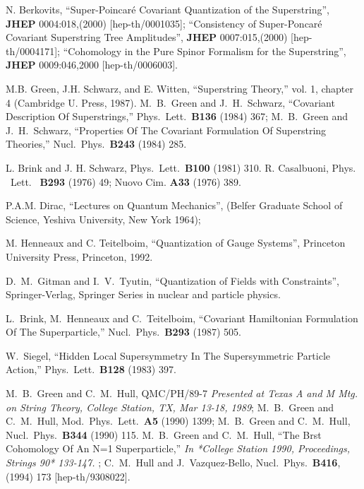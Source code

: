 \documentclass[a4paper,12pt]{article}
\begin{document}


\bigskip
\begin{thebibliography}{99}

  N. Berkovits, ``Super-Poincar\'e Covariant Quantization of the
  Superstring'', {\bf JHEP} 0004:018,(2000) [hep-th/0001035];
  ``Consistency of Super-Poncar\'e Covariant Superstring Tree
  Amplitudes'', {\bf JHEP} 0007:015,(2000) [hep-th/0004171];
  ``Cohomology in the Pure Spinor Formalism for the Superstring'',
  {\bf JHEP} 0009:046,2000 [hep-th/0006003].
  
   M.B. Green, J.H. Schwarz, and E. Witten, ``Superstring Theory,''  
  vol. 1, chapter 4 (Cambridge U. Press, 1987).  M.~B.~Green and
  J.~H.~Schwarz, ``Covariant Description Of Superstrings,'' Phys.\ 
  Lett.\ {\bf B136} (1984) 367; M.~B.~Green and J.~H.~Schwarz,
  ``Properties Of The Covariant Formulation Of Superstring Theories,''
  Nucl.\ Phys.\ {\bf B243} (1984) 285.

  L. Brink and J. H. Schwarz, Phys.\ Lett.\ {\bf B100} (1981) 310.
  R. Casalbuoni, Phys. \ Lett. \ {\bf B293} (1976) 49; Nuovo Cim. {\bf
    A33} (1976) 389.  

P.A.M. Dirac, ``Lectures on Quantum Mechanics'', 
(Belfer Graduate School of Science, Yeshiva University, New York 1964);   

  M. Henneaux and C. Teitelboim, ``Quantization of Gauge Systems'',
  Princeton University Press, Princeton, 1992.

 D.~M.~Gitman and I.~V.~Tyutin, ``Quantization of Fields with Constraints'', 
 Springer-Verlag, Springer Series in nuclear and particle physics. 

L.~Brink, M.~Henneaux and C.~Teitelboim, 
``Covariant Hamiltonian Formulation Of The Superparticle,''
Nucl.\ Phys.\  {\bf B293} (1987) 505.

   W.~Siegel, ``Hidden Local Supersymmetry In The Supersymmetric
  Particle Action,'' Phys.\ Lett.\ {\bf B128} (1983) 397.

M.~B.~Green and C.~M.~Hull, QMC/PH/89-7
{\it Presented at Texas A and M Mtg. on String Theory, College
  Station, TX, Mar 13-18, 1989};  
M.~B.~Green and C.~M.~Hull, Mod.\ Phys.\ Lett.\  {\bf A5} (1990) 1399; 
M.~B.~Green and C.~M.~Hull, Nucl.\ Phys.\  {\bf B344} (1990) 115.
M.~B.~Green and C.~M.~Hull, ``The Brst Cohomology Of An N=1 Superparticle,''
{\it  In *College Station 1990, Proceedings, Strings 90* 133-147. }; 
C.~M.~Hull and J.~Vazquez-Bello, Nucl.\ Phys.\  {\bf B416}, (1994) 
173 
[hep-th/9308022].


\end{thebibliography}
\end{document}
